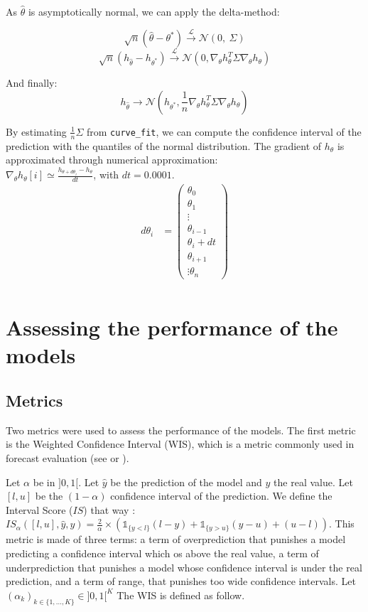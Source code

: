 As $\hat{\theta}$ is asymptotically normal, we can apply the delta-method: 

\[
\sqrt{n} (\hat{\theta} -\theta^*) \xrightarrow{\mathcal{L}} \mathcal{N}(0, \ \Sigma)
\]
\[
\sqrt{n} (h_{\hat{\theta}} -h_{\theta^*}) \xrightarrow{\mathcal{L}} \mathcal{N}(0, \nabla_\theta h_\theta ^T \Sigma  \nabla_\theta h_\theta)
\]

And finally: 
\[
h_{\hat{\theta}} \rightarrow \mathcal{N}(h_{\theta^*}, \frac{1}{n}\nabla_\theta h_\theta ^T \Sigma  \nabla_\theta h_\theta)
\]

By estimating $\frac{1}{n} \Sigma$ from \texttt{curve\_fit}, we can compute the confidence interval of the prediction with the quantiles of the normal distribution.
The gradient of $h_\theta$ is approximated through numerical approximation: \\
$\nabla_\theta h_\theta [i] \simeq \frac{h_{\theta + d \theta _ i  } - h_\theta}{dt}$, with $dt=0.0001$. \\

\begin{align*}
    d\theta_i &= \begin{pmatrix}
    \theta_0 \\
    \theta_1\\
    \vdots \\
    \theta_{i-1}\\
    \theta_i + dt \\
    \theta_{i+1}\\
    \vdots
    \theta_n 
    \end{pmatrix} \\    
\end{align*}


\section*{Assessing the performance of the models}

\subsection*{Metrics}
\label{sec:metrics}
Two metrics were used to assess the performance of the models. 
The first metric is the Weighted Confidence Interval (WIS), which is a metric commonly used in forecast evaluation (see \cite[text]{cramer2022evaluation} or \cite*{paireau2022ensemble}). 

Let $\alpha$ be in $]0, 1[$. Let $\hat{y}$ be the prediction of the model and $y$ the real value.
Let $[l, u]$ be the $(1-\alpha)$ confidence interval of the prediction.
We define the Interval Score ($IS$) that way : \\
$IS_\alpha( [l, u], \hat{y}, y ) = \frac{2}{\alpha} \times ( \mathbb{1}_{\{y<l\}} (l-y) + \mathbb{1}_{\{y>u\}} (y-u) + (u-l))$. 
This metric is made of three terms: a term of overprediction that punishes a model predicting a confidence interval which os above the real value, a term of underprediction that punishes a model whose confidence interval is under the real prediction, and a term of range, that punishes too wide confidence intervals. 
Let $(\alpha_k)_{k \in \{1, \dots , K\}} \in ] 0 , 1 [ ^K $
The WIS is defined as follow. \\

